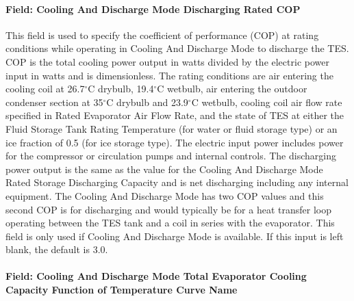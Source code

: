 \paragraph{Field: Cooling And Discharge Mode Discharging Rated COP}\label{field-cooling-and-discharge-mode-discharging-rated-cop}

This field is used to specify the coefficient of performance (COP) at rating conditions while operating in Cooling And Discharge Mode to discharge the TES. COP is the total cooling power output in watts divided by the electric power input in watts and is dimensionless. The rating conditions are air entering the cooling coil at 26.7$^\circ$C drybulb, 19.4$^\circ$C wetbulb, air entering the outdoor condenser section at 35$^\circ$C drybulb and 23.9$^\circ$C wetbulb, cooling coil air flow rate specified in Rated Evaporator Air Flow Rate, and the state of TES at either the Fluid Storage Tank Rating Temperature (for water or fluid storage type) or an ice fraction of 0.5 (for ice storage type). The electric input power includes power for the compressor or circulation pumps and internal controls. The discharging power output is the same as the value for the Cooling And Discharge Mode Rated Storage Discharging Capacity and is net discharging including any internal equipment. The Cooling And Discharge Mode has two COP values and this second COP is for discharging and would typically be for a heat transfer loop operating between the TES tank and a coil in series with the evaporator. This field is only used if Cooling And Discharge Mode is available. If this input is left blank, the default is 3.0.

\paragraph{Field: Cooling And Discharge Mode Total Evaporator Cooling Capacity Function of Temperature Curve Name}\label{field-cooling-and-discharge-mode-total-evaporator-cooling-capacity-function-of-temperature-curve-name}

